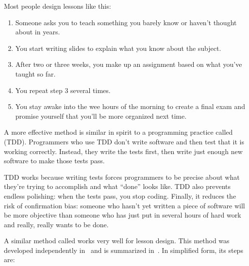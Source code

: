 
Most people design lessons like this:

\begin{enumerate}

\item
  Someone asks you to teach something you barely know
  or haven't thought about in years.

\item
  You start writing slides to explain what you know about the subject.

\item
  After two or three weeks,
  you make up an assignment based on what you've taught so far.

\item
  You repeat step 3 several times.

\item
  You stay awake into the wee hours of the morning
  to create a final exam
  and promise yourself that you'll be more organized next time.

\end{enumerate}

A more effective method is similar in spirit to a programming practice called
 (TDD).
Programmers who use TDD don't write software
and then test that it is working correctly.
Instead,
they write the tests first,
then write just enough new software to make those tests pass.

TDD works because writing tests forces programmers to be precise about
what they're trying to accomplish and what ``done'' looks like.
TDD also prevents endless polishing:
when the tests pass, you stop coding.
Finally,
it reduces the risk of confirmation bias:
someone who hasn't yet written a piece of software
will be more objective than someone who has just put in several hours of hard work
and really, really wants to be done.

A similar method called  works very well for lesson design.
This method was developed independently in~\cite{Wigg2005,Bigg2011,Fink2013}
and is summarized in~\cite{McTi2013}.
In simplified form, its steps are:

